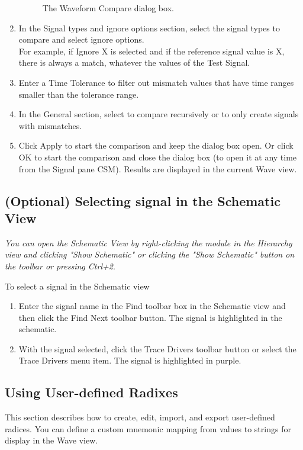 \documentclass[a4paper,12pt,twoside]{article}
\begin{document}
\begin{enumerate}
\begin{figure}[H]
        \caption{The Waveform Compare dialog box.}
        \label{f31}
    \end{figure}
    \item In the Signal types and ignore options section, select the signal types to compare and select ignore options.\\
    For example, if Ignore X is selected and if the reference signal value is X, there is always a match, whatever the values of the Test Signal.
    \item Enter a Time Tolerance to filter out mismatch values that have time ranges smaller than the tolerance range.
    \item In the General section, select to compare recursively or to only create signals with mismatches.
    \item Click Apply to start the comparison and keep the dialog box open. Or click OK to start the comparison and close the dialog box (to open it at any time from the Signal pane CSM). Results are displayed in the current Wave view.
\end{enumerate}
\subsection{(Optional) Selecting signal in the Schematic View}\label{SSch}
\textit{You can open the Schematic View by right-clicking the module in the Hierarchy view and clicking "Show Schematic" or clicking the "Show Schematic" button on the toolbar or pressing Ctrl+2}.

To select a signal in the Schematic view
\begin{enumerate}
    \item Enter the signal name in the Find toolbar box in the Schematic view and then click the Find Next toolbar button. The signal is highlighted in the schematic.
    \item With the signal selected, click the Trace Drivers toolbar button or select the Trace Drivers menu item. The signal is highlighted in purple.
\end{enumerate}
\subsection{Using User-defined Radixes}\label{SRadix}
This section describes how to create, edit, import, and export user-defined radices. You can define a custom mnemonic mapping from values to strings for display in the Wave view.
\end{document}
